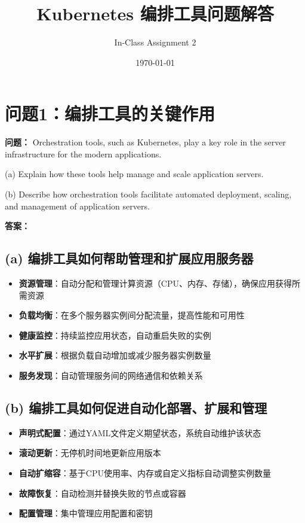 \documentclass[12pt,a4paper]{article}
\title{Kubernetes 编排工具问题解答}
\author{In-Class Assignment 2}
\date{\today}
\begin{document}
\maketitle

\section{问题1：编排工具的关键作用}

\textbf{问题：} Orchestration tools, such as Kubernetes, play a key role in the server infrastructure for the modern applications.

(a) Explain how these tools help manage and scale application servers.

(b) Describe how orchestration tools facilitate automated deployment, scaling, and management of application servers.

\textbf{答案：}

\subsection{(a) 编排工具如何帮助管理和扩展应用服务器}

\begin{itemize}
    \item \textbf{资源管理}：自动分配和管理计算资源（CPU、内存、存储），确保应用获得所需资源
    \item \textbf{负载均衡}：在多个服务器实例间分配流量，提高性能和可用性
    \item \textbf{健康监控}：持续监控应用状态，自动重启失败的实例
    \item \textbf{水平扩展}：根据负载自动增加或减少服务器实例数量
    \item \textbf{服务发现}：自动管理服务间的网络通信和依赖关系
\end{itemize}

\subsection{(b) 编排工具如何促进自动化部署、扩展和管理}

\begin{itemize}
    \item \textbf{声明式配置}：通过YAML文件定义期望状态，系统自动维护该状态
    \item \textbf{滚动更新}：无停机时间地更新应用版本
    \item \textbf{自动扩缩容}：基于CPU使用率、内存或自定义指标自动调整实例数量
    \item \textbf{故障恢复}：自动检测并替换失败的节点或容器
    \item \textbf{配置管理}：集中管理应用配置和密钥
\end{itemize}
\end{document}

